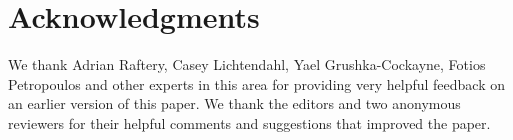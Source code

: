 \documentclass[a4paper,11pt]{article}
\begin{document}
\section*{Acknowledgments}

We thank Adrian Raftery, Casey Lichtendahl, Yael Grushka-Cockayne, Fotios Petropoulos and other experts in this area for providing very helpful feedback on an earlier version of this paper. We thank the editors and two anonymous reviewers for their helpful comments and suggestions that improved the paper.

\newpage
\printbibliography
\end{document}
